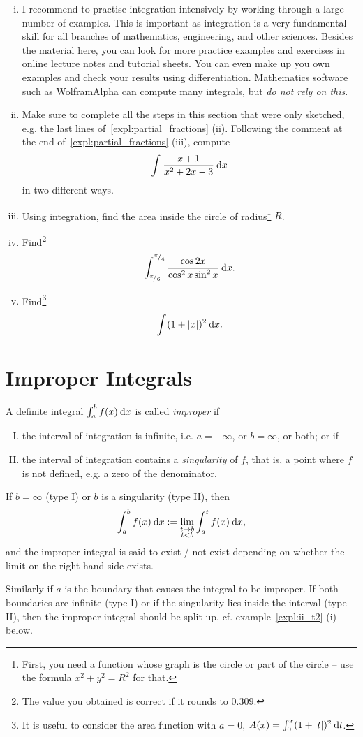 \begin{exercise}
\begin{enumerate}[(i)]
	\item I recommend to practise integration intensively by working through a large number of examples. This is important as integration is a very fundamental skill for all branches of mathematics, engineering, and other sciences. Besides the material here, you can look for more practice examples and exercises in online lecture notes and tutorial sheets. You can even make up you own examples and check your results using differentiation. Mathematics software such as WolframAlpha can compute many integrals, but \emph{do not rely on this}. 
	\item Make sure to complete all the steps in this section that were only sketched, e.g. the last lines of~\ref{expl:partial_fractions} (ii). Following the comment at the end of~\ref{expl:partial_fractions} (iii), compute
	\[ \int_{}^{} \frac{x+1}{x^2+2x-3} \: \mathrm{d} x \]
	in two different ways.
	\item Using integration, find the area inside the circle of radius\footnote{First, you need a function whose graph is the circle or part of the circle -- use the formula $x^2+y^2=R^2$ for that.} $R$.
	\item Find\footnote{The value you obtained is correct if it rounds to $0.309$.}
	\[ \int_{{}^{\pi}\!/_{6}}^{{}^{\pi}\!/_{4}} \frac{\cos 2x}{\cos^2 x \sin^2 x} \: \mathrm{d} x. \]
	\item Find\footnote{It is useful to consider the area function with $a=0$, $A(x)=\int_{0}^{x} (1+\left| t \right|)^2 \: \mathrm{d} t$.}
	\[ \int_{}^{} (1+\left| x \right|)^2 \: \mathrm{d} x. \]
	
\end{enumerate}		
\end{exercise}


\section{Improper Integrals}

\begin{definition}
A definite integral $\int_{a}^{b} f(x) \: \mathrm{d} x$ is called \emph{improper} if
\begin{enumerate}[(I)]
	\item the interval of integration is infinite, i.e. $a=-\infty$, or $b=\infty$, or both;
			 or if 
	\item the interval of integration contains a \emph{singularity} of $f$, that is, a point where $f$ is not defined, e.g. a zero of the denominator.
\end{enumerate}
If $b=\infty$ (type I) or $b$ is a singularity (type II), then
\[ \int_{a}^{b} f(x) \: \mathrm{d} x := \lim_{\substack{t \to b \\ t<b}} \int_{a}^{t} f(x) \: \mathrm{d} x, \]
and the improper integral is said to exist / not exist depending on whether the limit on the right-hand side exists.

Similarly if $a$ is the boundary that causes the integral to be improper. If both boundaries are infinite (type I) or if the singularity lies inside the interval (type II), then the improper integral should be split up, cf. example~\ref{expl:ii_t2} (i) below.
\end{definition}

